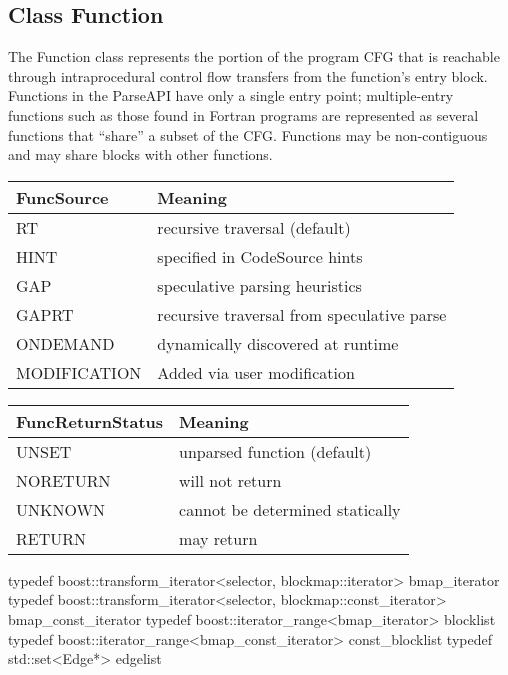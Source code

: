 \subsection{Class Function}


The Function class represents the portion of the program CFG that is reachable through intraprocedural control flow transfers from the function's entry block. Functions in the ParseAPI have only a single entry point; multiple-entry functions such as those found in Fortran programs are represented as several functions that ``share'' a subset of the CFG. Functions may be non-contiguous and may share blocks with other functions. 

\begin{center}
\begin{tabular}{ll}
\toprule
FuncSource & Meaning \\
\midrule
RT & recursive traversal (default) \\
HINT & specified in CodeSource hints \\
GAP & speculative parsing heuristics \\
GAPRT & recursive traversal from speculative parse \\
ONDEMAND & dynamically discovered at runtime \\
MODIFICATION & Added via user modification \\
\bottomrule
\end{tabular}
\end{center}


\begin{center}
\begin{tabular}{ll}
\toprule
FuncReturnStatus & Meaning \\
\midrule
UNSET & unparsed function (default) \\
NORETURN & will not return \\
UNKNOWN & cannot be determined statically \\
RETURN & may return \\
\bottomrule
\end{tabular}
\end{center}

\begin{apient}
typedef boost::transform_iterator<selector, blockmap::iterator> bmap_iterator
typedef boost::transform_iterator<selector, blockmap::const_iterator> bmap_const_iterator
typedef boost::iterator_range<bmap_iterator> blocklist
typedef boost::iterator_range<bmap_const_iterator> const_blocklist
typedef std::set<Edge*> edgelist
\end{apient}

